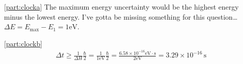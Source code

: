 \documentclass[boxes,pages]{homework}
\makeatletter
\numberwithin{@problem}{section}
\makeatother
\begin{document}
\begin{solution}

	\ref{part:clocka}
	The maximum energy uncertainty would be the highest energy minus the lowest energy. I've gotta be missing something for this question\dots $\Delta E = E_\text{max} - E_1 = 1\text{eV}$.

	\ref{part:clockb}
	\begin{align*}
		\Delta t \geq \frac{1}{\Delta H}\frac{\hbar}{2} = \frac{1}{1\text{eV}}\frac{\hbar}{2} = \frac{6.58\times 10^{-16}\text{eV}\cdot\text{s}}{2\text{eV}} = 3.29\times 10^{-16}\,\text{s}
	\end{align*}

\end{solution}
\end{document}
